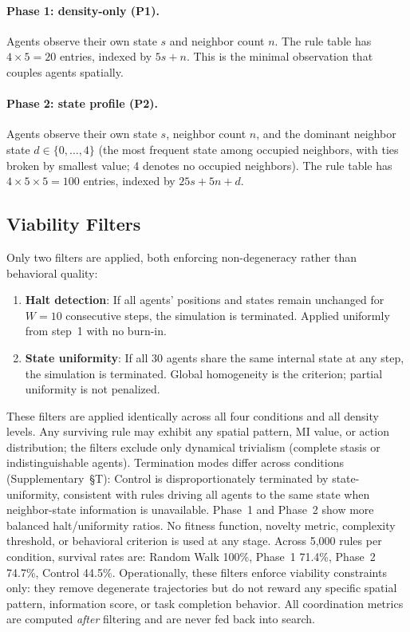 \documentclass[letterpaper]{article}
\begin{document}
\paragraph{Phase 1: density-only (P1).}
Agents observe their own state $s$ and neighbor count $n$. The rule table has
$4 \times 5 = 20$ entries, indexed by $5s + n$. This is the minimal
observation that couples agents spatially.

\paragraph{Phase 2: state profile (P2).}
Agents observe their own state $s$, neighbor count $n$, and the dominant
neighbor state $d \in \{0,\ldots,4\}$ (the most frequent state among occupied
neighbors, with ties broken by smallest value; 4 denotes no occupied neighbors).
The rule table has $4 \times 5 \times 5 = 100$ entries, indexed by
$25s + 5n + d$.

\subsection{Viability Filters}

Only two filters are applied, both enforcing non-degeneracy rather than
behavioral quality:
\begin{enumerate}
  \item \textbf{Halt detection}: If all agents' positions and states remain
        unchanged for $W=10$ consecutive steps, the simulation is terminated.
        Applied uniformly from step~1 with no burn-in.
  \item \textbf{State uniformity}: If all 30 agents share the same internal
        state at any step, the simulation is terminated.
        Global homogeneity is the criterion; partial uniformity is not penalized.
\end{enumerate}
These filters are applied identically across all four conditions and all density
levels.  Any surviving rule may exhibit any spatial pattern, MI value, or action
distribution; the filters exclude only dynamical trivialism (complete stasis or
indistinguishable agents).
Termination modes differ across conditions (Supplementary~\S{}T): Control is disproportionately terminated by state-uniformity, consistent with rules driving all agents to the same state when neighbor-state information is unavailable. Phase~1 and Phase~2 show more balanced halt/uniformity ratios.
No fitness function, novelty metric, complexity threshold, or behavioral
criterion is used at any stage.
Across 5{,}000 rules per condition, survival rates are:
Random Walk 100\%, Phase~1 71.4\%, Phase~2 74.7\%, Control 44.5\%.
Operationally, these filters enforce viability constraints only: they remove
degenerate trajectories but do not reward any specific spatial pattern,
information score, or task completion behavior. All coordination metrics are
computed \emph{after} filtering and are never fed back into search.
\end{document}
